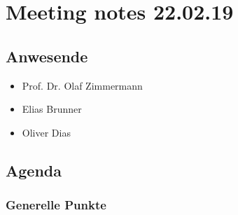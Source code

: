 \hypertarget{meeting-notes-220219}{%
\section*{Meeting notes 22.02.19}\label{meeting-notes-220219}}

\hypertarget{anwesende}{%
\subsection*{Anwesende}\label{anwesende}}

\begin{itemize}

\item
  Prof. Dr. Olaf Zimmermann
\item
  Elias Brunner
\item
  Oliver Dias
\end{itemize}

\hypertarget{agenda}{%
\subsection*{Agenda}\label{agenda}}

\hypertarget{generelle-punkte}{%
\subsubsection*{Generelle Punkte}\label{generelle-punkte}}

